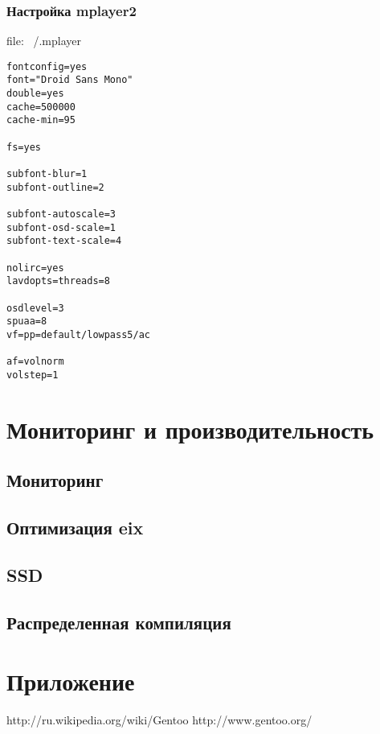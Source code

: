 \documentclass[10pt, a4paper]{article}
\begin{document}
\subsubsection{Настройка mplayer2}
file: ~/.mplayer
\begin{verbatim}
fontconfig=yes
font="Droid Sans Mono"
double=yes
cache=500000
cache-min=95

fs=yes

subfont-blur=1
subfont-outline=2

subfont-autoscale=3
subfont-osd-scale=1
subfont-text-scale=4

nolirc=yes
lavdopts=threads=8

osdlevel=3
spuaa=8
vf=pp=default/lowpass5/ac

af=volnorm
volstep=1
\end{verbatim}

\newpage
\section{Мониторинг и производительность}

\subsection{Мониторинг}

\subsection{Оптимизация eix}

\subsection{SSD}

\subsection{Распределенная компиляция}

\newpage

\section{Приложение}


\newpage
\begin{thebibliography}{99}

	 http://ru.wikipedia.org/wiki/Gentoo
	 http://www.gentoo.org/
	

\end{thebibliography}
\end{document}

